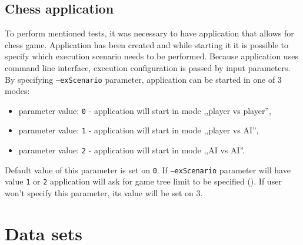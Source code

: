 \subsection{Chess application}
To perform mentioned tests, it was necessary to have application that allows for chess game. Application has been created and while starting it it is possible to specify which execution scenario needs to be performed. Because application uses command line interface, execution configuration is passed by input parameters. By specifying \texttt{--exScenario} parameter, application can be started in one of 3 modes:
\begin{itemize}
    \item parameter value: \texttt{0} - application will start in mode ,,player vs player'',
    \item parameter value: \texttt{1} - application will start in mode ,,player vs AI'',
    \item parameter value: \texttt{2} - application will start in mode ,,AI vs AI''.
\end{itemize}
Default value of this parameter is set on \texttt{0}. If \texttt{--exScenario} parameter will have value \texttt{1} or \texttt{2} application will ask for game tree limit to be specified (). If user won't specify this parameter, its value will be set on $3$.

\section{Data sets}\label{sec:data-sets}


